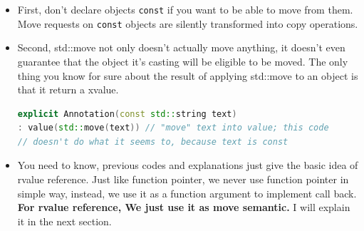 \documentclass[a4paper,12pt,twoside]{book}
\begin{document}
\begin{itemize}
\item First, don't declare objects \texttt{const} if you want to be able to move from them. Move requests on \texttt{const} objects are silently transformed into copy operations.

\item Second, std::move not only doesn't actually move anything, it doesn't even guarantee that the object it's casting will be eligible to be moved. The only thing you know for sure about the result of applying std::move to an object is that it return a xvalue.

\begin{lstlisting}[frame=single, language=c++]
explicit Annotation(const std::string text)
: value(std::move(text)) // "move" text into value; this code
// doesn't do what it seems to, because text is const
\end{lstlisting}


\item You need to know,  previous codes and explanations just give the basic idea of rvalue reference. Just like function pointer, we never use function pointer in simple way, instead, we use it as a function argument to implement call back.  \textbf{For rvalue reference, We just use it as move semantic.} I will explain it in the next section.

\end{itemize}
\end{document}
